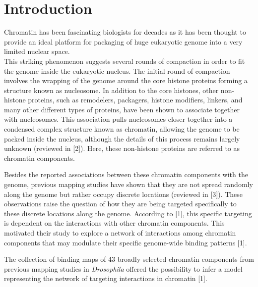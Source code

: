 \documentclass{bioinfo}
\begin{document}
\section{Introduction}
\lettrine[lines=3,findent=0pt, nindent=0.5pt]{C}{}hromatin has been fascinating biologists for decades as it has been thought to provide an ideal platform for packaging of huge eukaryotic genome into a very limited nuclear space.\\ This striking phenomenon suggests several rounds of compaction in order to fit the genome inside the eukaryotic nucleus. The initial round of compaction involves the wrapping of the genome around the core histone proteins forming a structure known as nucleosome. In addition to the core histones, other non-histone proteins, such as remodelers, packagers, histone modifiers, linkers, and many other different types of proteins, have been shown to associate together with nucleosomes. This association pulls nucleosomes closer together into a condensed complex structure known as chromatin, allowing the genome to be packed inside the nucleus, although the details of this process remains largely unknown (reviewed in [2]). Here, these non-histone proteins are referred to as chromatin components. 

Besides the reported associations between these chromatin components with the genome, previous mapping studies have shown that they are not spread randomly along the genome but rather occupy discrete locations (reviewed in [3]). These observations raise the question of how they are being targeted specifically to these discrete locations along the genome. According to [1], this specific targeting is dependent on the interactions with other chromatin components. This motivated their study to explore a network of interactions among chromatin components that may modulate their specific genome-wide binding patterns [1].

The collection of binding maps of 43 broadly selected chromatin components from previous mapping studies in \textit{Drosophila} offered the possibility to infer a model representing the network of targeting interactions in chromatin [1].  
\end{document}
